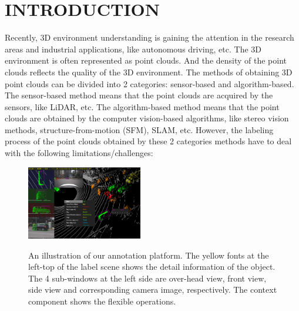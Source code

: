 \documentclass[letterpaper, 10 pt, conference]{ieeeconf}  %
\begin{document}
\section{INTRODUCTION}
Recently, 3D environment understanding is gaining the attention in the research areas and industrial applications, like autonomous driving, etc. The 3D environment is often represented as point clouds. And the density of the point clouds reflects the quality of the 3D environment. The methods of obtaining 3D point clouds can be divided into 2 categories: sensor-based and algorithm-based. The sensor-based method means that the point clouds are acquired by the sensors, like LiDAR, etc. The algorithm-based method means that the point clouds are obtained by the computer vision-based algorithms, like stereo vision methods, structure-from-motion (SFM), SLAM, etc. However, the labeling process of the point clouds obtained by these 2 categories methods have to deal with the following limitations/challenges:
\begin{figure}[ht]
 \centering
 \includegraphics[width=0.45\textwidth]{./figures/main_ui}\\ %
  \caption{An illustration of our annotation platform. The yellow fonts at the left-top of the label scene shows the detail information of the object. The 4 sub-windows at the left side are over-head view, front view, side view and corresponding camera image, respectively. The context component shows the flexible operations.}
     \label{fig:main_ui}
\end{figure}
\end{document}
